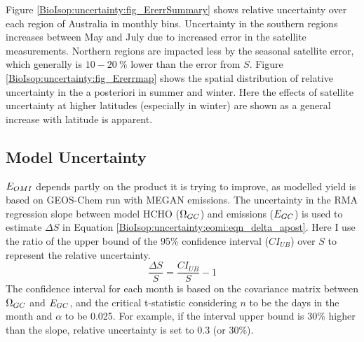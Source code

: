     
    Figure \ref{BioIsop:uncertainty:fig_ErerrSummary} shows relative uncertainty over each region of Australia in monthly bins.
    Uncertainty in the southern regions increases between May and July due to increased error in the satellite measurements.
    Northern regions are impacted less by the seasonal satellite error, which generally is $10-20~\%$ lower than the error from $S$.
    Figure \ref{BioIsop:uncertainty:fig_Ererrmap} shows the spatial distribution of relative uncertainty in the a posteriori in summer and winter.
    Here the effects of satellite uncertainty at higher latitudes (especially in winter) are shown as a general increase with latitude is apparent.
    
    
    
    
  \subsection{Model Uncertainty}
    \label{BioIsop:uncertainty:Model}
    
    $E_{OMI}$ depends partly on the product it is trying to improve, as modelled yield is based on GEOS-Chem run with MEGAN emissions.
    The uncertainty in the RMA regression slope between model HCHO ($\Omega_{GC}$) and emissions ($E_{GC}$) is used to estimate $\Delta S$ in Equation \ref{BioIsop:uncertainty:eomi:eqn_delta_apost}.
    Here I use the ratio of the upper bound of the 95\% confidence interval ($CI_{UB}$) over $S$ to represent the relative uncertainty.
    \begin{equation}
      \frac{\Delta S}{S} = \frac{CI_{UB}}{S} - 1
    \end{equation}
    The confidence interval for each month is based on the covariance matrix between $\Omega_{GC}$ and $E_{GC}$, and the critical t-statistic considering $n$ to be the days in the month and $\alpha$ to be 0.025.
    For example, if the interval upper bound is 30\% higher than the slope, relative uncertainty is set to 0.3 (or 30\%).
    
